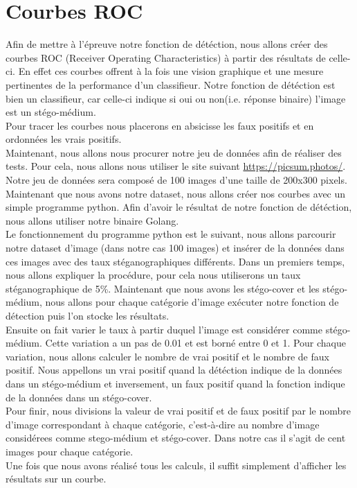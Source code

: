 \documentclass[letterpaper,12pt, french]{article}
\begin{document}
\section{Courbes ROC}
\label{sec:org0470fa7}
Afin de mettre à l'épreuve notre fonction de détéction, nous allons créer des courbes ROC (Receiver Operating Characteristics) à partir des résultats de celle-ci. 
En effet ces courbes offrent à la fois une vision graphique et une mesure pertinentes de la performance d’un classifieur. Notre fonction de détéction est bien un classifieur, car celle-ci indique si  oui ou non(i.e. réponse binaire) l'image est un stégo-médium.
\vspace{1\baselineskip}
\\
Pour tracer les courbes nous placerons en absicisse les faux positifs et en ordonnées les vrais positifs.
\vspace{1\baselineskip}
\\
Maintenant, nous allons nous procurer notre jeu de données afin de réaliser des tests. Pour cela, nous
allons nous utiliser le site suivant \url{https://picsum.photos/}. Notre jeu de données sera composé de 100 images d'une taille de 200x300 pixels. 
\vspace{1\baselineskip}
\\
Maintenant que nous avons notre dataset, nous allons créer nos courbes avec un simple programme python. Afin d'avoir le résultat de notre fonction de détéction, nous allons utiliser notre binaire Golang. 
\vspace{1\baselineskip}
\\
Le fonctionnement du programme python est le suivant, nous allons parcourir notre dataset d'image (dans notre cas 100 images) et insérer de la données dans ces images avec des taux stéganographiques différents. Dans un premiers temps, nous allons expliquer la procédure, pour cela nous utiliserons un taux stéganographique de 5\%. 
Maintenant que nous avons les stégo-cover et les stégo-médium, nous allons pour chaque catégorie d'image exécuter notre fonction de détection puis l'on stocke les résultats. 
\vspace{1\baselineskip}
\\
Ensuite on fait varier le taux à partir duquel l'image est considérer comme stégo-médium.
Cette variation a un pas de 0.01 et est borné entre 0 et 1. Pour chaque variation, nous allons calculer le nombre de vrai positif et le nombre de faux positif. Nous appellons un vrai positif quand la détéction indique de la données dans un stégo-médium et inversement, un faux positif quand la fonction indique de la données dans un stégo-cover. 
\vspace{1\baselineskip}
\\
Pour finir, nous divisions la valeur de vrai positif et de faux positif par le nombre d'image correspondant à chaque catégorie, c'est-à-dire au nombre d'image considérees comme stego-médium et stégo-cover. Dans notre cas il s'agit de cent images pour chaque catégorie.
\vspace{1\baselineskip}
\\
Une fois que nous avons réalisé tous les calculs, il suffit simplement d'afficher les résultats sur un courbe. 
\end{document}
